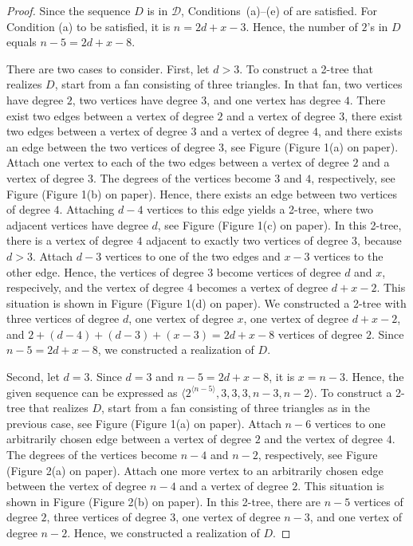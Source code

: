 \documentclass[lotsofwhite,charterfonts]{patmorin}
\newcommand{\rep}[1]{^{\langle#1\rangle}}
\begin{document}
\begin{proof}
Since the sequence $D$ is in $\mathcal{D}$, Conditions~(a)--(e) of
 are satisfied. For Condition (a) to be satisfied, it is
$n=2d+x-3$. Hence, the number of $2$'s in $D$ equals $n-5 = 2d+x-8$.

There are two cases to consider. First, let $d > 3$. To construct a
2-tree that realizes $D$, start from a fan consisting of three
triangles. In that fan, two vertices have degree $2$, two vertices
have degree $3$, and one vertex has degree $4$. There exist two edges
between a vertex of degree $2$ and a vertex of degree $3$, there exist
two edges between a vertex of degree $3$ and a vertex of degree $4$,
and there exists an edge between the two vertices of degree $3$, see
Figure (Figure 1(a) on paper). Attach one vertex to each of the two
edges between a vertex of degree $2$ and a vertex of degree $3$. The
degrees of the vertices become $3$ and $4$, respectively, see Figure
(Figure 1(b) on paper). Hence, there exists an edge between two
vertices of degree $4$. Attaching $d-4$ vertices to this edge yields a
2-tree, where two adjacent vertices have degree $d$, see Figure
(Figure 1(c) on paper). In this 2-tree, there is a vertex of degree
$4$ adjacent to exactly two vertices of degree $3$, because $d >
3$. Attach $d-3$ vertices to one of the two edges and $x-3$ vertices
to the other edge. Hence, the vertices of degree $3$ become vertices
of degree $d$ and $x$, respecively, and the vertex of degree $4$
becomes a vertex of degree $d+x-2$. This situation is shown in Figure
(Figure 1(d) on paper). We constructed a 2-tree with three vertices of
degree $d$, one vertex of degree $x$, one vertex of degree $d+x-2$,
and $2+(d-4)+(d-3)+(x-3) = 2d+x-8$ vertices of degree $2$. Since $n-5
= 2d+x-8$, we constructed a realization of $D$.

Second, let $d = 3$. Since $d=3$ and $n-5 = 2d+x-8$, it is $x =
n-3$. Hence, the given sequence can be expressed as $\langle
2\rep{n-5},3,3,3,n-3,n-2 \rangle$. To construct a 2-tree that realizes
$D$, start from a fan consisting of three triangles as in the previous
case, see Figure (Figure 1(a) on paper). Attach $n-6$ vertices to one
arbitrarily chosen edge between a vertex of degree $2$ and the vertex
of degree $4$. The degrees of the vertices become $n-4$ and $n-2$,
respectively, see Figure (Figure 2(a) on paper). Attach one more
vertex to an arbitrarily chosen edge between the vertex of degree
$n-4$ and a vertex of degree $2$. This situation is shown in Figure
(Figure 2(b) on paper). In this 2-tree, there are $n-5$ vertices of
degree $2$, three vertices of degree $3$, one vertex of degree $n-3$,
and one vertex of degree $n-2$. Hence, we constructed a realization of
$D$.
\end{proof}
\end{document}
